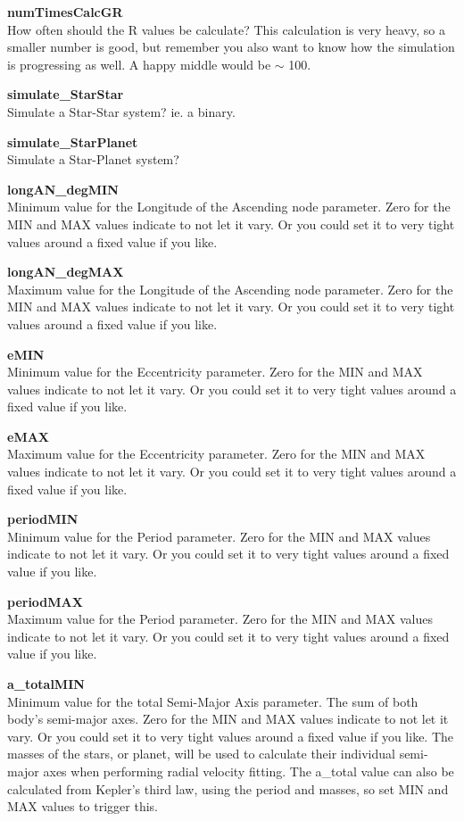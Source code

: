 \documentclass[12pt,preprint]{aastex}
\begin{document}
{\bf numTimesCalcGR}\\
How often should the R values be calculate?  This calculation is very heavy, so a smaller number is good, but remember you also want to know how the simulation is progressing as well.  A happy middle would be $\sim$ 100.

{\bf simulate\_StarStar }\\
Simulate a Star-Star system?  ie. a binary.

{\bf simulate\_StarPlanet}\\
Simulate a Star-Planet system?

{\bf longAN\_degMIN}\\
Minimum value for the Longitude of the Ascending node parameter.
Zero for the MIN and MAX values indicate to not let it vary.  Or you could set it to very tight values around a fixed value if you like.

{\bf longAN\_degMAX}\\
Maximum value for the Longitude of the Ascending node parameter.
Zero for the MIN and MAX values indicate to not let it vary.  Or you could set it to very tight values around a fixed value if you like.

{\bf eMIN}\\
Minimum value for the Eccentricity parameter.
Zero for the MIN and MAX values indicate to not let it vary.  Or you could set it to very tight values around a fixed value if you like.

{\bf eMAX}\\
Maximum value for the Eccentricity parameter.
Zero for the MIN and MAX values indicate to not let it vary.  Or you could set it to very tight values around a fixed value if you like.

{\bf periodMIN}\\
Minimum value for the Period parameter.
Zero for the MIN and MAX values indicate to not let it vary.  Or you could set it to very tight values around a fixed value if you like.

{\bf periodMAX}\\
Maximum value for the Period parameter.
Zero for the MIN and MAX values indicate to not let it vary.  Or you could set it to very tight values around a fixed value if you like.

{\bf a\_totalMIN}\\
Minimum value for the total Semi-Major Axis parameter.  The sum of both body's semi-major axes.
Zero for the MIN and MAX values indicate to not let it vary.  Or you could set it to very tight values around a fixed value if you like.  The masses of the stars, or planet, will be used to calculate their individual semi-major axes when performing radial velocity fitting.  The a\_total value can also be calculated from Kepler's third law, using the period and masses, so set MIN and MAX values to trigger this. 
\end{document}
